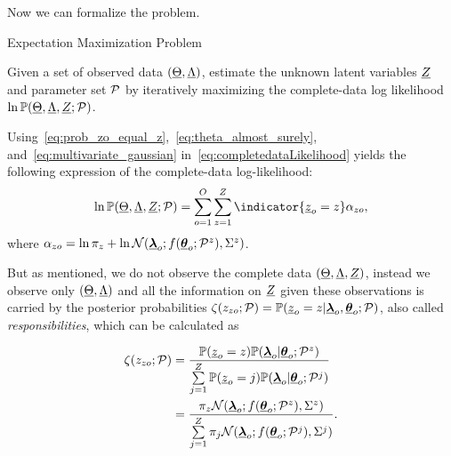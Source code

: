 \documentclass{ifacconf}  %
\begin{document}
Now we can formalize the \EM{} problem.
\begin{problem}{Expectation Maximization Problem}\label{pb:EM}

  Given a set of observed data $(\underline{\Theta},\underline{\Lambda})$, estimate the unknown latent variables $\underline{Z}$ and parameter set $\mathcal{P}$ by iteratively maximizing  the complete-data log likelihood $\ln\mathbb{P}(\underline{\Theta},\underline{\Lambda},\underline{Z};\mathcal{P})$.
\end{problem}

Using~\eqref{eq:prob_zo_equal_z},~\eqref{eq:theta_almost_surely}, and~\eqref{eq:multivariate_gaussian} in~\eqref{eq:completedataLikelihood} yields {\color{blue}the following expression of the complete-data log-likelihood:}
\begin{equation}\label{eq:completedataLogLikelihood_complete}
\ln\probability{\random{\Theta},\random{\Lambda},\random{Z};\set{P}}=  \sum_{o=1}^{O}\sum_{z=1}^{Z}{\indicator{\random{z}_{o}=z}}
  \alpha_{zo},
\end{equation}
where ${\alpha_{zo}=\ln{\pi_{z}}+\ln{\mathcal{N}({\underline{\boldsymbol{\lambda}}}_{o};f({\underline{\boldsymbol{\theta}}}_{o};\mathcal{P}^{z}),{\Sigma^{z}})}}$.

But as mentioned, we do not observe the complete data $(\underline{\Theta},\underline{\Lambda},\underline{Z})$, instead we observe only $(\underline{\Theta},\underline{\Lambda})$ and all the information on $\underline{Z}$ given these observations is carried by the posterior probabilities  ${\zeta(z_{zo};\mathcal{P})=\mathbb{P}(\underline{z}_{o}=z|{\underline{\boldsymbol{\lambda}}}_{o},{\underline{\boldsymbol{\theta}}}_{o};\mathcal{P})}$, also called \emph{responsibilities}, which can be calculated as

\begin{align}
  \label{eq:responsibilities}
\zeta(z_{zo};\mathcal{P})&=\frac{\mathbb{P}(\underline{z}_{o}=z)\mathbb{P}({\underline{\boldsymbol{\lambda}}}_{o}|{\underline{\boldsymbol{\theta}}}_{o};\mathcal{P}^{z})}{\sum\limits_{j=1}^{Z}\mathbb{P}(\underline{z}_{o}=j)\mathbb{P}({\underline{\boldsymbol{\lambda}}}_{o}|{\underline{\boldsymbol{\theta}}}_{o};\mathcal{P}^{j})}\nonumber\\
  &=\frac{\pi_{z}{\mathcal{N}({\underline{\boldsymbol{\lambda}}}_{o};f({\underline{\boldsymbol{\theta}}}_{o};\mathcal{P}^{z}),{\Sigma^{z}})}}{\sum\limits_{j=1}^{Z}\pi_{j}\mathcal{N}({\underline{\boldsymbol{\lambda}}}_{o};f({\underline{\boldsymbol{\theta}}}_{o};\mathcal{P}^{j}),{\Sigma^{j}})}.
\end{align}
\end{document}
